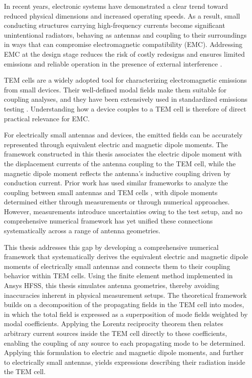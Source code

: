 
In recent years, electronic systems have demonstrated a clear trend toward reduced physical dimensions and increased operating speeds. As a result, small conducting structures carrying high-frequency currents become significant unintentional radiators, behaving as antennas and coupling to their surroundings in ways that can compromise electromagnetic compatibility (EMC). Addressing EMC at the design stage reduces the risk of costly redesigns and ensures limited emissions and reliable operation in the presence of external interference  \cite[p.~64]{Paul_Scully_Steffka_2023}.

TEM cells are a widely adopted tool for characterizing electromagnetic emissions from small devices. Their well-defined modal fields make them suitable for coupling analyses, and they have been extensively used in standardized emissions testing \cites{9153508,809846,Koepke_1989}. Understanding how a device couples to a TEM cell is therefore of direct practical relevance for EMC.

For electrically small antennas and devices, the emitted fields can be accurately represented through equivalent electric and magnetic dipole moments. The framework constructed in this thesis associates the electric dipole moment with the displacement currents of the antenna coupling to the TEM cell, while the magnetic dipole moment reflects the antenna's inductive coupling driven by conduction current. Prior work has used similar frameworks to analyze the coupling between small antennas and TEM cells \cites{Kreindl_Bauernfeind_Weiss_Stockreiter_Kaltenbacher_2024,10742020,10274360,Sreenivasiah_Chang_Ma_1981}, with dipole moments determined either through measurements or through numerical approaches. However, measurements introduce uncertainties owing to the test setup, and no comprehensive numerical framework has yet unified these connections systematically across a range of antenna geometries.

This thesis addresses this gap by developing a comprehensive numerical framework that systematically derives the equivalent electric and magnetic dipole moments of electrically small antennas and connects them to their coupling behavior within TEM cells. Using the finite element method implemented in Ansys HFSS, this thesis simulates antenna geometries, thereby avoiding inaccuracies inherent in physical measurement setups. The theoretical framework builds on a decomposition of the propagating fields in the TEM cell into modes, in which the total field is expressed as a superposition of mode fields weighted by modal coefficients. Applying the Lorentz reciprocity theorem then relates arbitrary current sources inside the TEM cell directly to these coefficients, enabling the coupling of any source to each propagating mode to be determined. Applying this formulation to electric and magnetic dipole moments, and further to electrically small antennas, yields expressions describing their radiation inside the TEM cell.

